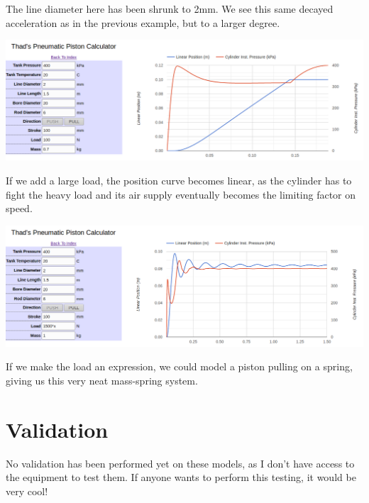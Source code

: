 \documentclass[10pt,letterpaper]{article}
\begin{document}
	The line diameter here has been shrunk to 2mm. We see this same decayed acceleration as in the previous example, but to a larger degree.
	
	\includegraphics[width=\textwidth]{pneu_case_5.png}
	
	If we add a large load, the position curve becomes linear, as the cylinder has to fight the heavy load and its air supply eventually becomes the limiting factor on speed.
	
	\includegraphics[width=\textwidth]{pneu_case_6.png}
	
	If we make the load an expression, we could model a piston pulling on a spring, giving us this very neat mass-spring system.
	
	\section*{Validation}
		No validation has been performed yet on these models, as I don't have access to the equipment to test them. If anyone wants to perform this testing, it would be very cool!
	
	
\end{document}
